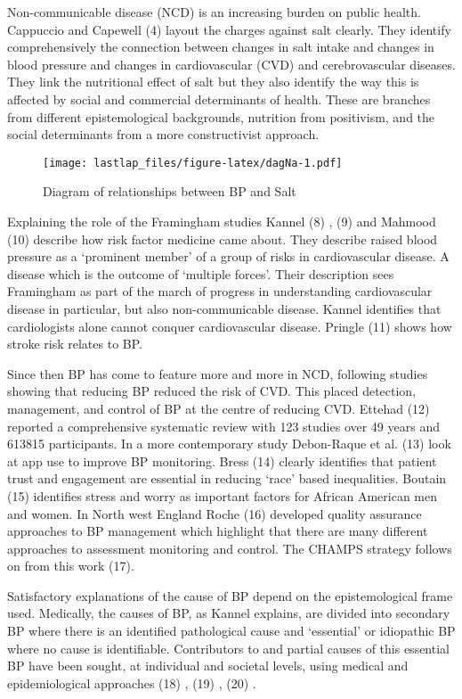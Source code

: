 \documentclass[
]{article}
\begin{document}
Non-communicable disease (NCD) is an increasing burden on public health.
Cappuccio and Capewell (4) layout the charges against salt clearly. They
identify comprehensively the connection between changes in salt intake
and changes in blood pressure and changes in cardiovascular (CVD) and
cerebrovascular diseases. They link the nutritional effect of salt but
they also identify the way this is affected by social and commercial
determinants of health. These are branches from different
epistemological backgrounds, nutrition from positivism, and the social
determinants from a more constructivist approach.

\begin{figure}
\centering
\texttt{[image: lastlap\_files/figure-latex/dagNa-1.pdf]}
\caption{Diagram of relationships between BP and Salt}
\end{figure}

Explaining the role of the Framingham studies Kannel (8) , (9) and
Mahmood (10) describe how risk factor medicine came about. They describe
raised blood pressure as a `prominent member' of a group of risks in
cardiovascular disease. A disease which is the outcome of `multiple
forces'. Their description sees Framingham as part of the march of
progress in understanding cardiovascular disease in particular, but also
non-communicable disease. Kannel identifies that cardiologists alone
cannot conquer cardiovascular disease. Pringle (11) shows how stroke
risk relates to BP.

Since then BP has come to feature more and more in NCD, following
studies showing that reducing BP reduced the risk of CVD. This placed
detection, management, and control of BP at the centre of reducing CVD.
Ettehad (12) reported a comprehensive systematic review with 123 studies
over 49 years and 613815 participants. In a more contemporary study
Debon-Raque et al. (13) look at app use to improve BP monitoring. Bress
(14) clearly identifies that patient trust and engagement are essential
in reducing `race' based inequalities. Boutain (15) identifies stress
and worry as important factors for African American men and women. In
North west England Roche (16) developed quality assurance approaches to
BP management which highlight that there are many different approaches
to assessment monitoring and control. The CHAMPS strategy follows on
from this work (17).

Satisfactory explanations of the cause of BP depend on the
epistemological frame used. Medically, the causes of BP, as Kannel
explains, are divided into secondary BP where there is an identified
pathological cause and `essential' or idiopathic BP where no cause is
identifiable. Contributors to and partial causes of this essential BP
have been sought, at individual and societal levels, using medical and
epidemiological approaches (18) , (19) , (20) .
\end{document}
